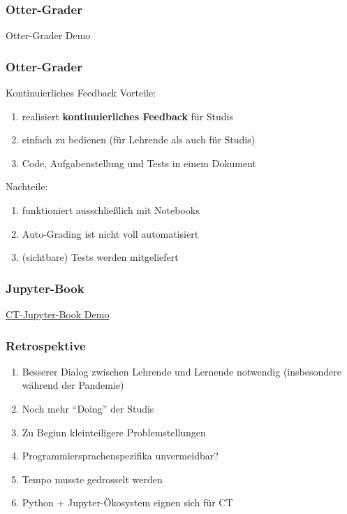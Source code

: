 \documentclass[german,aspectratio=169]{beamer}
\begin{document}
\begin{frame}
	\frametitle{Otter-Grader}
	\begin{center}
		Otter-Grader Demo
	\end{center}
\end{frame}

\begin{frame}
	\frametitle{Otter-Grader}
	\begin{block}{Kontinuierliches Feedback}
			Vorteile:
		\begin{enumerate}[label = $\bullet$]
			\item realisiert \textbf{kontinuierliches Feedback} für Studis
			\item einfach zu bedienen (für Lehrende als auch für Studis)
			\item Code, Aufgabenstellung und Tests in einem Dokument
		\end{enumerate}
		Nachteile:
		\begin{enumerate}[label = $\bullet$]
			\item funktioniert ausschließlich mit Notebooks
			\item Auto-Grading ist nicht voll automatisiert
			\item (sichtbare) Tests werden mitgeliefert
		\end{enumerate}
	\end{block}
\end{frame}

\begin{frame}
	\frametitle{Jupyter-Book}
	\begin{center}
		\href{https://bzoennchen.github.io/ct-book/intro.html}{CT-Jupyter-Book Demo}
	\end{center}
\end{frame}

\begin{frame}
	\frametitle{Retrospektive}
	\begin{enumerate}[label = $\bullet$]
		\item Besserer Dialog zwischen Lehrende und Lernende notwendig (insbesondere während der Pandemie)
		\item Noch mehr ``Doing'' der Studis
		\item Zu Beginn kleinteiligere Problemstellungen		 
		\item Programmiersprachenspezifika unvermeidbar?
		\item Tempo musste gedrosselt werden
		\item Python + Jupyter-Ökosystem eignen sich für CT		
	\end{enumerate}
\end{frame}
\end{document}
